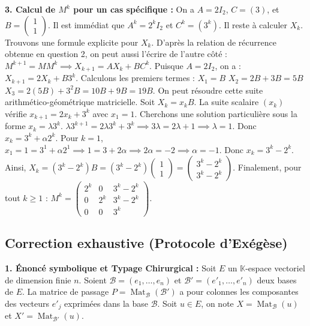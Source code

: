 \documentclass{report}
\begin{document}
\textbf{3. Calcul de $M^k$ pour un cas spécifique :}
On a $A = 2I_2$, $C = (3)$, et $B = \begin{pmatrix} 1 \\ 1 \end{pmatrix}$.
Il est immédiat que $A^k = 2^k I_2$ et $C^k = (3^k)$.
Il reste à calculer $X_k$. Trouvons une formule explicite pour $X_k$.
D'après la relation de récurrence obtenue en question 2, on peut aussi l'écrire de l'autre côté :
$M^{k+1} = M M^k \implies X_{k+1} = A X_k + B C^k$.
Puisque $A = 2I_2$, on a : $X_{k+1} = 2 X_k + B 3^k$.
Calculons les premiers termes :
$X_1 = B$
$X_2 = 2B + 3B = 5B$
$X_3 = 2(5B) + 3^2 B = 10B + 9B = 19B$.
On peut résoudre cette suite arithmético-géométrique matricielle. Soit $X_k = x_k B$.
La suite scalaire $(x_k)$ vérifie $x_{k+1} = 2x_k + 3^k$ avec $x_1 = 1$.
Cherchons une solution particulière sous la forme $x_k = \lambda 3^k$.
$\lambda 3^{k+1} = 2 \lambda 3^k + 3^k \implies 3\lambda = 2\lambda + 1 \implies \lambda = 1$.
Donc $x_k = 3^k + \alpha 2^k$.
Pour $k=1$, $x_1 = 1 = 3^1 + \alpha 2^1 \implies 1 = 3 + 2\alpha \implies 2\alpha = -2 \implies \alpha = -1$.
Donc $x_k = 3^k - 2^k$.
Ainsi, $X_k = (3^k - 2^k) B = (3^k - 2^k) \begin{pmatrix} 1 \\ 1 \end{pmatrix} = \begin{pmatrix} 3^k - 2^k \\ 3^k - 2^k \end{pmatrix}$.
Finalement, pour tout $k \ge 1$ :
$M^k = \begin{pmatrix} 2^k & 0 & 3^k - 2^k \\ 0 & 2^k & 3^k - 2^k \\ 0 & 0 & 3^k \end{pmatrix}$.







\subsection*{Correction exhaustive (Protocole d'Exégèse)}

\textbf{1. Énoncé symbolique et Typage Chirurgical :}
Soit $E$ un $\mathbb{K}$-espace vectoriel de dimension finie $n$. Soient $\mathcal{B} = (e_1, \dots, e_n)$ et $\mathcal{B}' = (e'_1, \dots, e'_n)$ deux bases de $E$.
La matrice de passage $P = \operatorname{Mat}_{\mathcal{B}}(\mathcal{B}')$ a pour colonnes les composantes des vecteurs $e'_j$ exprimées dans la base $\mathcal{B}$.
Soit $u \in E$, on note $X = \operatorname{Mat}_{\mathcal{B}}(u)$ et $X' = \operatorname{Mat}_{\mathcal{B}'}(u)$.
\end{document}
